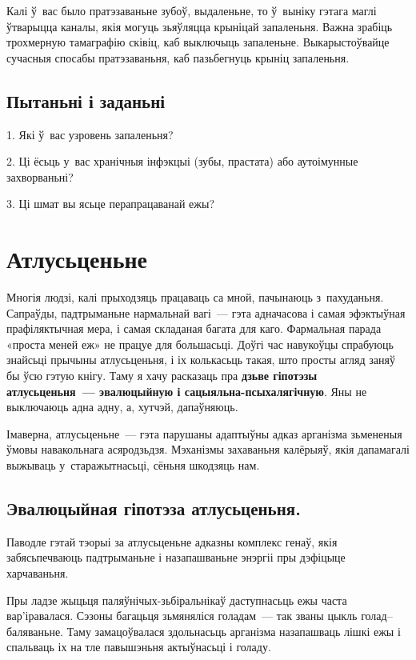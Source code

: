 Калі ў~вас было пратэзаваньне зубоў, выдаленьне, то ў~выніку гэтага маглі ўтварыцца каналы, якія могуць зьяўляцца крыніцай запаленьня. Важна зрабіць трохмерную тамаграфію сківіц, каб выключыць запаленьне. Выкарыстоўвайце сучасныя спосабы пратэзаваньня, каб пазьбегнуць крыніц запаленьня.

\subsection*{Пытаньні і заданьні}

1. Які ў~вас узровень запаленьня?

2. Ці ёсьць у~вас хранічныя інфэкцыі (зубы, прастата) або аутоімунные захворваньні?

3. Ці шмат вы ясьце перапрацаванай ежы?


\section{Атлусьценьне}

Многія людзі, калі прыходзяць працаваць са мной, пачынаюць з~пахуданьня. Сапраўды, падтрыманьне нармальнай вагі~--- гэта адначасова і самая эфэктыўная прафіляктычная мера, і самая складаная багата для каго. Фармальная парада «проста меней еж» не працуе для большасьці. Доўгі час навукоўцы спрабуюць знайсьці прычыны атлусьценьня, і іх колькасьць такая, што просты агляд заняў бы ўсю гэтую кнігу. Таму я хачу расказаць пра \textbf{дзьве гіпотэзы атлусьценьня~--- эвалюцыйную і сацыяльна-псыхалягічную}. Яны не выключаюць адна адну, а, хутчэй, дапаўняюць.

Імаверна, атлусьценьне~--- гэта парушаны адаптыўны адказ арганізма зьмененыя ўмовы навакольнага асяродзьдзя. Мэханізмы захаваньня калёрыяў, якія дапамагалі выжываць у~старажытнасьці, сёньня шкодзяць нам.

\subsection*{Эвалюцыйная гіпотэза атлусьценьня.}

Паводле гэтай тэорыі за атлусьценьне адказны комплекс генаў, якія забясьпечваюць падтрыманьне і назапашваньне энэргіі пры дэфіцыце харчаваньня.

Пры ладзе жыцьця паляўнічых-зьбіральнікаў даступнасьць ежы часта вар'іравалася. Сэзоны багацьця зьмяняліся голадам~--- так званы цыкль голад--баляваньне. Таму замацоўвалася здольнасьць арганізма назапашваць лішкі ежы і спальваць іх на тле павышэньня актыўнасьці і голаду. 

